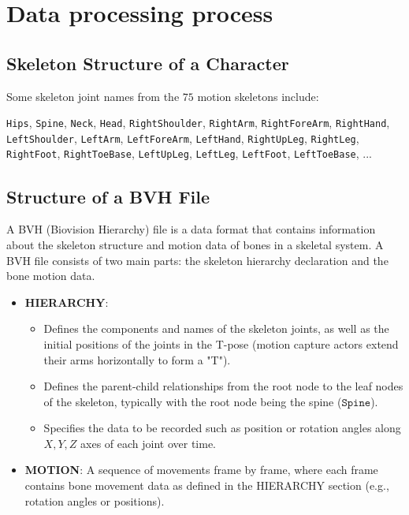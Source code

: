 \section{Data processing process}
\label{appendix:BVHData}

\subsection{Skeleton Structure of a Character}
\label{appendix:BVHSkeleton}

Some skeleton joint names from the $75$ motion skeletons include:

{
	\small
	\texttt{Hips},
	\texttt{Spine},
	\texttt{Neck},
	\texttt{Head},
	\texttt{RightShoulder},
	\texttt{RightArm},
	\texttt{RightForeArm},
	\texttt{RightHand},
	\texttt{LeftShoulder},
	\texttt{LeftArm},
	\texttt{LeftForeArm},
	\texttt{LeftHand},
	\texttt{RightUpLeg},
	\texttt{RightLeg},
	\texttt{RightFoot},
	\texttt{RightToeBase},
	\texttt{LeftUpLeg},
	\texttt{LeftLeg},
	\texttt{LeftFoot},
	\texttt{LeftToeBase},
	...
}


\subsection{Structure of a BVH File}
\label{appendix:BVHStructure}

A BVH (Biovision Hierarchy) file is a data format that contains information about the skeleton structure and motion data of bones in a skeletal system. A BVH file consists of two main parts: the skeleton hierarchy declaration and the bone motion data.

\begin{itemize}
	\item \textbf{HIERARCHY}:
	
	\begin{itemize}
		\item Defines the components and names of the skeleton joints, as well as the initial positions of the joints in the T-pose (motion capture actors extend their arms horizontally to form a "T").
		\item Defines the parent-child relationships from the root node to the leaf nodes of the skeleton, typically with the root node being the spine ($\texttt{Spine}$).
		\item Specifies the data to be recorded such as position or rotation angles along $X, Y, Z$ axes of each joint over time.
	\end{itemize}
	
	\item \textbf{MOTION}: A sequence of movements frame by frame, where each frame contains bone movement data as defined in the HIERARCHY section (e.g., rotation angles or positions).
\end{itemize}

